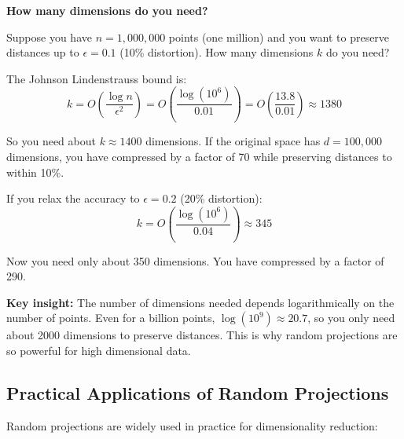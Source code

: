 \begin{examplebox}
\textbf{How many dimensions do you need?}

\vspace{0.5em}

Suppose you have $n = 1{,}000{,}000$ points (one million) and you want to preserve distances up to $\epsilon = 0.1$ (10\% distortion). How many dimensions $k$ do you need?

\vspace{0.5em}

The Johnson Lindenstrauss bound is:
\begin{equation*}
k = O\left(\frac{\log n}{\epsilon^2}\right) = O\left(\frac{\log(10^6)}{0.01}\right) = O\left(\frac{13.8}{0.01}\right) \approx 1380
\end{equation*}

So you need about $k \approx 1400$ dimensions. If the original space has $d = 100{,}000$ dimensions, you have compressed by a factor of 70 while preserving distances to within 10\%.

\vspace{0.5em}

If you relax the accuracy to $\epsilon = 0.2$ (20\% distortion):
\begin{equation*}
k = O\left(\frac{\log(10^6)}{0.04}\right) \approx 345
\end{equation*}

Now you need only about 350 dimensions. You have compressed by a factor of 290.

\vspace{0.5em}

\textbf{Key insight:} The number of dimensions needed depends logarithmically on the number of points. Even for a billion points, $\log(10^9) \approx 20.7$, so you only need about 2000 dimensions to preserve distances. This is why random projections are so powerful for high dimensional data.
\end{examplebox}

\vspace{1.5em}

\subsection{Practical Applications of Random Projections}

Random projections are widely used in practice for dimensionality reduction:


